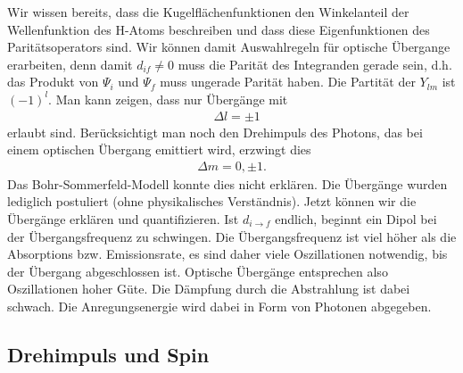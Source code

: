\begin{enumerate}[label=\arabic{*}.)]
Wir wissen bereits, dass die Kugelflächenfunktionen den Winkelanteil der
Wellenfunktion des H-Atoms beschreiben und dass diese Eigenfunktionen des
Paritätsoperators sind. Wir können damit Auswahlregeln für optische
Übergange erarbeiten, denn damit $d_{if}\neq 0$ muss die Parität des
Integranden gerade sein, d.h. das Produkt von $\Psi_i$ und $\Psi_f$ muss
ungerade Parität haben. Die Partität der $Y_{lm}$ ist $(-1)^l$. Man kann
zeigen, dass nur Übergänge mit
\begin{align*}
&\Delta l = \pm 1
\end{align*}
erlaubt sind. Berücksichtigt man noch den Drehimpuls des Photons, das bei einem
optischen Übergang emittiert wird, erzwingt dies
\begin{align*}
\Delta m = 0,\pm 1.
\end{align*}
Das Bohr-Sommerfeld-Modell konnte dies nicht erklären. Die Übergänge wurden
lediglich postuliert (ohne physikalisches Verständnis). Jetzt können wir die
Übergänge erklären und quantifizieren. Ist $d_{i\to f}$ endlich, beginnt ein
Dipol bei der Übergangsfrequenz zu schwingen.
Die Übergangsfrequenz ist viel höher als die Absorptions bzw. Emissionsrate, es
sind daher viele Oszillationen notwendig, bis der Übergang abgeschlossen ist.
Optische Übergänge entsprechen also Oszillationen hoher Güte. Die Dämpfung
durch die Abstrahlung ist dabei schwach. Die Anregungsenergie wird dabei in Form
von Photonen abgegeben.
\end{enumerate}

\newpage
\subsection{Drehimpuls und Spin}
